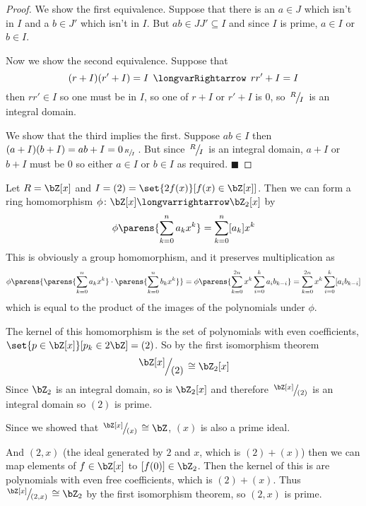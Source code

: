\documentclass[10pt]{article}
\def\implies{\,\mathrel{\longvarRightarrow}\,}
\let\longto=\longvarrightarrow
\def\qed{\hskip1cm\hbox{}\hfill$\blacksquare$}
\begin{document}
\begin{proof}

    We show the first equivalence.
    Suppose that there is an $a\in J$ which isn't in $I$ and a $b\in J'$ which isn't in $I$.
    But $ab\in JJ'\subseteq I$ and since $I$ is prime, $a\in I$ or $b\in I$.

    Now we show the second equivalence.
    Suppose that
    \[ (r + I)(r' + I) = I \implies rr' + I = I \]
    then $rr'\in I$ so one must be in $I$, so one of $r+I$ or $r'+I$ is $0$, so $\slfrac RI$ is an integral domain.

    We show that the third implies the first.
    Suppose $ab\in I$ then $(a+I)(b+I)=ab+I=0_{\slfrac RI}$.
    But since $\slfrac RI$ is an integral domain, $a+I$ or $b+I$ must be $0$ so either $a\in I$ or $b\in I$ as required.
    \qed

\end{proof}

\begin{exam*}

    Let $R=\bZ[x]$ and $I=(2)=\set{2f(x)}[f(x)\in{\bZ[x]}]$.
    Then we can form a ring homomorphism $\phi\colon\bZ[x]\longto\bZ_2[x]$ by
    \[ \phi\parens{\sum_{k=0}^n a_kx^k}=\sum_{k=0}^n [a_k]x^k \]
    This is obviously a group homomorphism, and it preserves multiplication as
    \[ \phi\parens{\parens{\sum_{k=0}^n a_kx^k}\cdot\parens{\sum_{k=0}^n b_kx^k}} = \phi\parens{\sum_{k=0}^{2n}x^k\sum_{i=0}^k a_ib_{k-i}} = \sum_{k=0}^{2n}x^k\sum_{i=0}^k[a_ib_{k-i}] \]
    which is equal to the product of the images of the polynomials under $\phi$.

    The kernel of this homomorphism is the set of polynomials with even coefficients, $\set{p\in\bZ[x]}[p_k\in2\bZ]=(2)$.
    So by the first isomorphism theorem
    \[ \slfrac{\bZ[x]}{(2)}\cong\bZ_2[x] \]
    Since $\bZ_2$ is an integral domain, so is $\bZ_2[x]$ and therefore $\slfrac{\bZ[x]}{(2)}$ is an integral domain so $(2)$ is prime.

\end{exam*}

\begin{exam*}

    Since we showed that $\slfrac{\bZ[x]}{(x)}\cong\bZ$, $(x)$ is also a prime ideal.

    And $(2,x)$ (the ideal generated by $2$ and $x$, which is $(2)+(x)$) then we can map elements of $f\in\bZ[x]$ to $[f(0)]\in\bZ_2$.
    Then the kernel of this is are polynomials with even free coefficients, which is $(2)+(x)$.
    Thus $\slfrac{\bZ[x]}{(2,x)}\cong\bZ_2$ by the first isomorphism theorem, so $(2,x)$ is prime.

\end{exam*}
\end{document}
